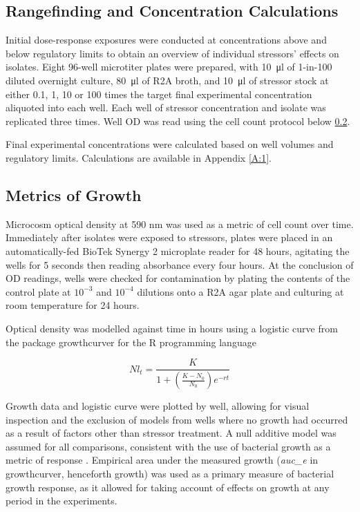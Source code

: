 \documentclass[review,12pt]{elsarticle}
\begin{document}
\subsection{Rangefinding and Concentration Calculations}
\label{S:2:3}

Initial dose-response exposures were conducted at concentrations above and below regulatory limits to obtain an overview of individual stressors' effects on isolates. Eight 96-well microtiter plates were prepared, with  \SI{10}{\ul} of 1-in-100 diluted overnight culture, \SI{80}{\ul} of R2A broth, and \SI{10}{\ul} of stressor stock at either 0.1, 1, 10 or 100 times the target final experimental concentration aliquoted into each well. Each well of stressor concentration and isolate was replicated three times. Well OD was read using the cell count protocol below  \ref{S:2:4}.

Final experimental concentrations were calculated based on well volumes and regulatory limits. Calculations are available in Appendix \ref{A:1}.

\subsection{Metrics of Growth}
\label{S:2:4}

Microcosm optical density at 590 nm was used as a metric of cell count over time. Immediately after isolates were exposed to stressors, plates were placed in an automatically-fed BioTek Synergy 2 microplate reader for 48 hours, agitating the wells for 5 seconds then reading absorbance every four hours.  At the conclusion of OD readings, wells were checked for contamination by plating the contents of the control plate at $10^{-3}$ and $10^{-4}$ dilutions onto a R2A agar plate and culturing at room temperature for 24 hours.

Optical density was modelled against time in hours using a logistic curve from the package growthcurver \cite{Sprouffske2016Package} for the R programming language \cite{RCoreTeam2018R:Computing}

\begin{equation}
Nl_t=\frac{K}{1 + (\frac{K - N_0}{N_0}) e^{-rt}}
\label{E:log_curve}
\end{equation}

Growth data and logistic curve were plotted by well, allowing for visual inspection and the exclusion of models from wells where no growth had occurred as a result of factors other than stressor treatment. A null additive model was assumed for all comparisons, consistent with the use of bacterial growth as a metric of response \cite{Piggott2015}. Empirical area under the measured growth (\textit{auc\_e} in growthcurver, henceforth growth) was used as a primary measure of bacterial growth response, as it allowed for taking account of effects on growth at any period in the experiments.
\end{document}
